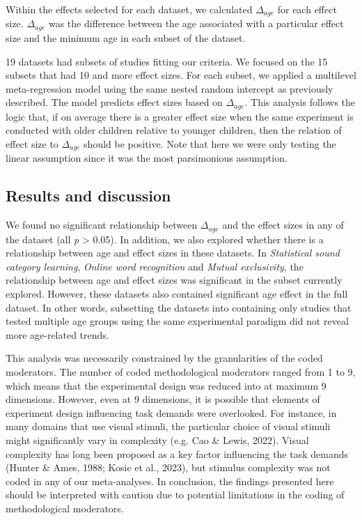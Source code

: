 \documentclass[
  man]{apa6}
\begin{document}
Within the effects selected for each dataset, we calculated \(\Delta_{age}\) for each effect size. \(\Delta_{age}\) was the difference between the age associated with a particular effect size and the minimum age in each subset of the dataset.

19 datasets had subsets of studies fitting our criteria. We focused on the 15 subsets that had 10 and more effect sizes. For each subset, we applied a multilevel meta-regression model using the same nested random intercept as previously described. The model predicts effect sizes based on \(\Delta_{age}\). This analysis follows the logic that, if on average there is a greater effect size when the same experiment is conducted with older children relative to younger children, then the relation of effect size to \(\Delta_{age}\) should be positive. Note that here we were only testing the linear assumption since it was the most parsimonious assumption.

\hypertarget{results-and-discussion-1}{%
\subsection{Results and discussion}\label{results-and-discussion-1}}

We found no significant relationship between \(\Delta_{age}\) and the effect sizes in any of the dataset (all \emph{p} \textgreater{} 0.05). In addition, we also explored whether there is a relationship between age and effect sizes in these datasets. In \emph{Statistical sound category learning}, \emph{Online word recognition} and \emph{Mutual exclusivity}, the relationship between age and effect sizes was significant in the subset currently explored. However, these datasets also contained significant age effect in the full dataset. In other words, subsetting the datasets into containing only studies that tested multiple age groups using the same experimental paradigm did not reveal more age-related trends.

This analysis was necessarily constrained by the granularities of the coded moderators. The number of coded methodological moderators ranged from 1 to 9, which means that the experimental design was reduced into at maximum 9 dimensions. However, even at 9 dimensions, it is possible that elements of experiment design influencing task demands were overlooked. For instance, in many domains that use visual stimuli, the particular choice of visual stimuli might significantly vary in complexity (e.g. Cao \& Lewis, 2022). Visual complexity has long been proposed as a key factor influencing the task demands (Hunter \& Ames, 1988; Kosie et al., 2023), but stimulus complexity was not coded in any of our meta-analyses. In conclusion, the findings presented here should be interpreted with caution due to potential limitations in the coding of methodological moderators.
\end{document}
